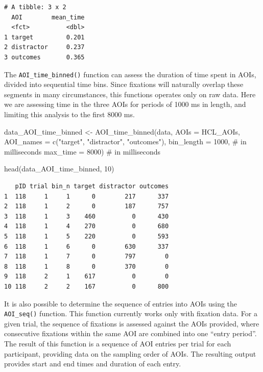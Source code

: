 \documentclass[
  man,
  floatsintext,
  longtable,
  nolmodern,
  notxfonts,
  notimes,
  colorlinks=true,linkcolor=blue,citecolor=blue,urlcolor=blue]{apa7}
\newenvironment{Shaded}{\begin{snugshade}}{\end{snugshade}}
\newcommand{\AttributeTok}[1]{\textcolor[rgb]{0.40,0.45,0.13}{#1}}
\newcommand{\CommentTok}[1]{\textcolor[rgb]{0.37,0.37,0.37}{#1}}
\newcommand{\DecValTok}[1]{\textcolor[rgb]{0.68,0.00,0.00}{#1}}
\newcommand{\FunctionTok}[1]{\textcolor[rgb]{0.28,0.35,0.67}{#1}}
\newcommand{\NormalTok}[1]{\textcolor[rgb]{0.00,0.23,0.31}{#1}}
\newcommand{\OtherTok}[1]{\textcolor[rgb]{0.00,0.23,0.31}{#1}}
\newcommand{\StringTok}[1]{\textcolor[rgb]{0.13,0.47,0.30}{#1}}
\begin{document}
\begin{verbatim}
# A tibble: 3 x 2
  AOI        mean_time
  <fct>          <dbl>
1 target         0.201
2 distractor     0.237
3 outcomes       0.365
\end{verbatim}

The \texttt{AOI\_time\_binned()} function can assess the duration of
time spent in AOIs, divided into sequential time bins. Since fixations
will naturally overlap these segments in many circumstances, this
functions operates only on raw data. Here we are assessing time in the
three AOIs for periods of 1000 ms in length, and limiting this analysis
to the first 8000 ms.

\begin{Shaded}
\begin{Highlighting}[]
\NormalTok{data\_AOI\_time\_binned }\OtherTok{\textless{}{-}} 
  \FunctionTok{AOI\_time\_binned}\NormalTok{(data, }
                  \AttributeTok{AOIs =}\NormalTok{ HCL\_AOIs,}
                  \AttributeTok{AOI\_names =} \FunctionTok{c}\NormalTok{(}\StringTok{"target"}\NormalTok{, }\StringTok{"distractor"}\NormalTok{, }\StringTok{"outcomes"}\NormalTok{),}
                  \AttributeTok{bin\_length =} \DecValTok{1000}\NormalTok{, }\CommentTok{\# in milliseconds}
                  \AttributeTok{max\_time =} \DecValTok{8000}\NormalTok{) }\CommentTok{\# in milliseconds}

\FunctionTok{head}\NormalTok{(data\_AOI\_time\_binned, }\DecValTok{10}\NormalTok{)}
\end{Highlighting}
\end{Shaded}

\begin{verbatim}
   pID trial bin_n target distractor outcomes
1  118     1     1      0        217      337
2  118     1     2      0        187      757
3  118     1     3    460          0      430
4  118     1     4    270          0      680
5  118     1     5    220          0      593
6  118     1     6      0        630      337
7  118     1     7      0        797        0
8  118     1     8      0        370        0
9  118     2     1    617          0        0
10 118     2     2    167          0      800
\end{verbatim}

It is also possible to determine the sequence of entries into AOIs using
the \texttt{AOI\_seq()} function. This function currently works only
with fixation data. For a given trial, the sequence of fixations is
assessed against the AOIs provided, where consecutive fixations within
the same AOI are combined into one ``entry period''. The result of this
function is a sequence of AOI entries per trial for each participant,
providing data on the sampling order of AOIs. The resulting output
provides start and end times and duration of each entry.
\end{document}
